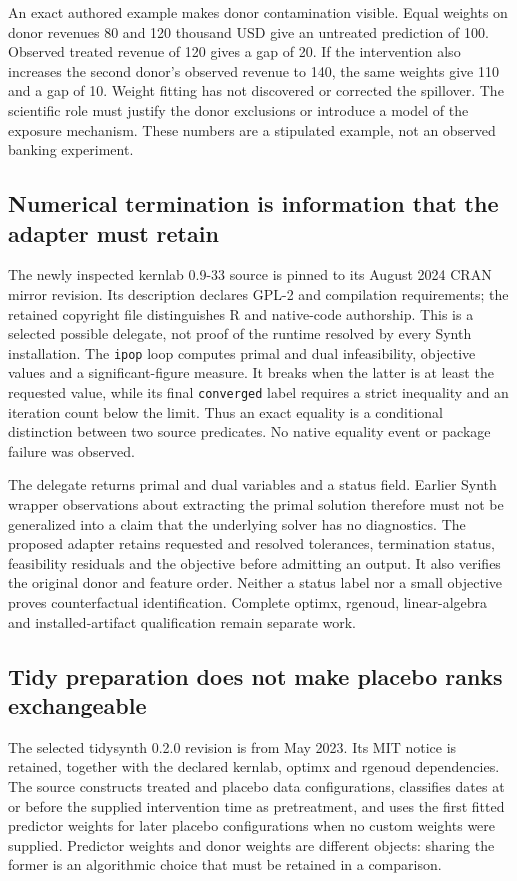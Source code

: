 An exact authored example makes donor contamination visible. Equal weights
on donor revenues 80 and 120 thousand USD give an untreated prediction of
100. Observed treated revenue of 120 gives a gap of 20. If the intervention
also increases the second donor's observed revenue to 140, the same weights
give 110 and a gap of 10. Weight fitting has not discovered or corrected the
spillover. The scientific role must justify the donor exclusions or introduce
a model of the exposure mechanism. These numbers are a stipulated example,
not an observed banking experiment.~\citep{exec25_synthr_choice}

\subsection{Numerical termination is information that the adapter must retain}
The newly inspected kernlab 0.9-33 source is pinned to its August 2024 CRAN
mirror revision. Its description declares GPL-2 and compilation requirements;
the retained copyright file distinguishes R and native-code authorship. This
is a selected possible delegate, not proof of the runtime resolved by every
Synth installation. The \texttt{ipop} loop computes primal and dual
infeasibility, objective values and a significant-figure measure. It breaks
when the latter is at least the requested value, while its final
\texttt{converged} label requires a strict inequality and an iteration count
below the limit. Thus an exact equality is a conditional distinction between
two source predicates. No native equality event or package failure was
observed.~\citep{exec25_synthr_kernlab}

The delegate returns primal and dual variables and a status field. Earlier
Synth wrapper observations about extracting the primal solution therefore
must not be generalized into a claim that the underlying solver has no
diagnostics. The proposed adapter retains requested and resolved tolerances,
termination status, feasibility residuals and the objective before admitting
an output. It also verifies the original donor and feature order. Neither a
status label nor a small objective proves counterfactual identification.
Complete optimx, rgenoud, linear-algebra and installed-artifact qualification
remain separate work.~\citep{exec25_synthr_kernlab,exec24_synth_source,
exec25_synthr_choice}

\subsection{Tidy preparation does not make placebo ranks exchangeable}
The selected tidysynth 0.2.0 revision is from May 2023. Its MIT notice is
retained, together with the declared kernlab, optimx and rgenoud dependencies.
The source constructs treated and placebo data configurations, classifies
dates at or before the supplied intervention time as pretreatment, and uses
the first fitted predictor weights for later placebo configurations when no
custom weights were supplied. Predictor weights and donor weights are
different objects: sharing the former is an algorithmic choice that must
be retained in a comparison.~\citep{exec25_synthr_tidysynth}

